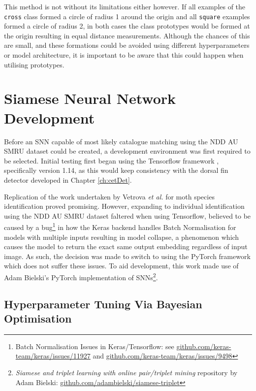 This method is not without its limitations either however. If all examples of the \texttt{cross} class formed a circle of radius 1 around the origin and all \texttt{square} examples formed a circle of radius 2, in both cases the class prototypes would be formed at the origin resulting in equal distance measurements. Although the chances of this are small, and these formations could be avoided using different hyperparameters or model architecture, it is important to be aware that this could happen when utilising prototypes. 

\section{Siamese Neural Network Development}\label{ch:ID,sec:SNNDevelopment}

Before an SNN capable of most likely catalogue matching using the NDD AU SMRU dataset could be created, a development environment was first required to be selected. Initial testing first began using the Tensorflow framework \cite{abadi_tensorflow:_2016}, specifically version 1.14, as this would keep consistency with the dorsal fin detector developed in Chapter \ref{ch:cetDet}. 

Replication of the work undertaken by Vetrova \textit{et al.} \cite{vetrova_hidden_2018} for moth species identification proved promising. However, expanding to individual identification using the NDD AU SMRU dataset faltered when using Tensorflow, believed to be caused by a bug\footnote{Batch Normalisation Issues in Keras/Tensorflow: see \href{https://github.com/keras-team/keras/issues/11927}{github.com/keras-team/keras/issues/11927} and  \href{https://github.com/keras-team/keras/issues/9498}{github.com/keras-team/keras/issues/9498}} in how the Keras backend handles Batch Normalisation for models with multiple inputs resulting in model collapse, a phenomenon which causes the model to return the exact same output embedding regardless of input image. As such, the decision was made to switch to using the PyTorch framework \cite{paszke_automatic_2017} which does not suffer these issues. To aid development, this work made use of Adam Bielski's PyTorch implementation of SNNs\footnote{\textit{Siamese and triplet learning with online pair/triplet mining} repository by Adam Bielski: \href{https://github.com/adambielski/siamese-triplet}{github.com/adambielski/siamese-triplet}}.

\subsection{Hyperparameter Tuning Via Bayesian Optimisation }\label{ch:ID,sec:SNNDevelopment,sub:Optuna}

